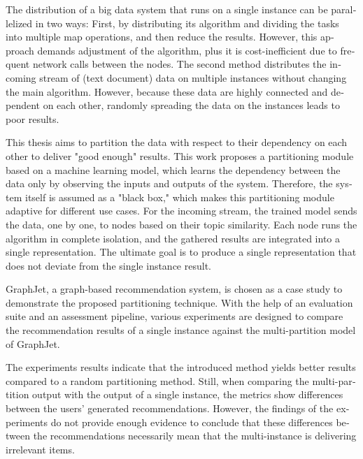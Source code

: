 
\null\vfil
\begin{otherlanguage}{english}
\begin{center}\textsf{\textbf{\abstractname}}\end{center}

\noindent
The distribution of a big data system that runs on a single instance can be parallelized in two ways: First, by distributing its algorithm and dividing the tasks into multiple map operations, and then reduce the results. However, this approach demands adjustment of the algorithm, plus it is cost-inefficient due to frequent network calls between the nodes. The second method distributes the incoming stream of (text document) data on multiple instances without changing the main algorithm. However, because these data are highly connected and dependent on each other, randomly spreading the data on the instances leads to poor results.

This thesis aims to partition the data with respect to their dependency on each other to deliver "good enough" results. This work proposes a partitioning module based on a machine learning model, which learns the dependency between the data only by observing the inputs and outputs of the system. Therefore, the system itself is assumed as a "black box," which makes this partitioning module adaptive for different use cases. For the incoming stream, the trained model sends the data, one by one, to nodes based on their topic similarity. Each node runs the algorithm in complete isolation, and the gathered results are integrated into a single representation. The ultimate goal is to produce a single representation that does not deviate from the single instance result.

GraphJet, a graph-based recommendation system, is chosen as a case study to demonstrate the proposed partitioning technique. With the help of an evaluation suite and an assessment pipeline, various experiments are designed to compare the recommendation results of a single instance against the multi-partition model of GraphJet.


The experiments results indicate that the introduced method yields better results compared to a random partitioning method. Still, when comparing the multi-partition output with the output of a single instance, the metrics show differences between the users' generated recommendations. However, the findings of the experiments do not provide enough evidence to conclude that these differences between the recommendations necessarily mean that the multi-instance is delivering irrelevant items.


\end{otherlanguage}
\vfil\null
\newpage

